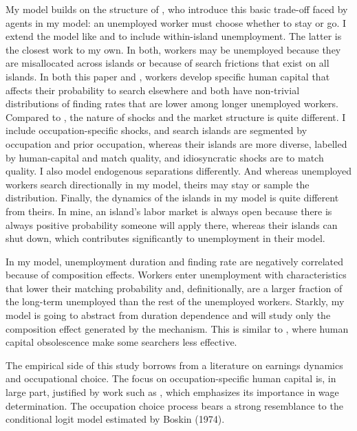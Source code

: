 \documentclass[12pt]{article}
\theoremstyle{definition}
\begin{document}
My model builds on the structure of \citet{lucasEquilibriumSearchUnemployment1974}, who introduce this basic trade-off faced by agents in my model: an unemployed worker must choose whether to stay or go. I extend the model like \citet{alvarezSearchRestUnemployment2011} and \citet{carrillo-tudelaUnemploymentEndogenousReallocation2023} to include within-island unemployment. The latter is the closest work to my own. In both, workers may be unemployed because they are misallocated across islands or because of search frictions that exist on all islands. In both this paper and \citet{carrillo-tudelaUnemploymentEndogenousReallocation2023}, workers develop specific human capital that affects their probability to search elsewhere and both have non-trivial distributions of finding rates that are lower among longer unemployed workers. Compared to \citet{carrillo-tudelaUnemploymentEndogenousReallocation2023}, the nature of shocks and the market structure is quite different. I include occupation-specific shocks, and search islands are segmented by occupation and prior occupation, whereas their islands are more diverse, labelled by human-capital and match quality, and idiosyncratic shocks are to match quality. I also model endogenous separations differently. And whereas unemployed workers search directionally in my model, theirs may stay or sample the distribution. Finally, the dynamics of the islands in my model is quite different from theirs. In mine, an island's labor market is always open because there is always positive probability someone will apply there, whereas their islands can shut down, which contributes significantly to unemployment in their model.

In my model, unemployment duration and finding rate are negatively correlated because of composition effects. Workers enter unemployment with characteristics that lower their matching probability and, definitionally, are a larger fraction of the long-term unemployed than the rest of the unemployed workers. Starkly, my model is going to abstract from duration dependence and will study only the composition effect generated by the mechanism. This is similar to \citet{ljungqvistEuropeanUnemploymentDilemma1998}, where human capital obsolescence make some searchers less effective.

The empirical side of this study borrows from a literature on earnings dynamics and occupational choice. The focus on occupation-specific human capital is, in large part, justified by work such as \citet{kambourovOccupationalMobilityWage2009}, which emphasizes its importance in wage determination. The occupation choice process bears a strong resemblance to the conditional logit model estimated by Boskin (1974).
\end{document}
